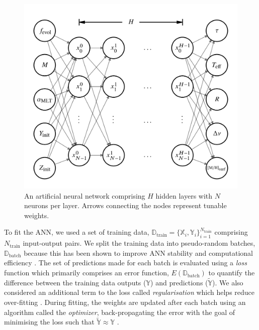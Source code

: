 \documentclass[fleqn,usenatbib]{mnras}
\begin{document}
\begin{figure}
    \includegraphics[width=\linewidth]{figures/network_10.png}
    \caption{An artificial neural network comprising $H$ hidden layers with $N$ neurons per layer. Arrows connecting the nodes represent tunable weights.}
    \label{fig:net}
\end{figure}

To fit the ANN, we used a set of training data, $\boldsymbol{\mathbb{D}}_\mathrm{train} = \{\boldsymbol{\mathbb{X}}_i, \boldsymbol{\mathbb{Y}}_i\}_{i=1}^{N_\mathrm{train}}$ comprising $N_\mathrm{train}$ input-output pairs. We split the training data into pseudo-random batches, $\boldsymbol{\mathbb{D}}_\mathrm{batch}$ because this has been shown to improve ANN stability and computational efficiency \citep{Masters.Luschi2018}. The set of predictions made for each batch is evaluated using a \emph{loss} function which primarily comprises an error function, $E(\boldsymbol{\mathbb{D}}_\mathrm{batch})$ to quantify the difference between the training data outputs ($\boldsymbol{\mathbb{Y}}$) and predictions ($\widetilde{\boldsymbol{\mathbb{Y}}}$). We also considered an additional term to the loss called \emph{regularisation} which helps reduce over-fitting \citep{Goodfellow.Bengio.ea2016}. During fitting, the weights are updated after each batch using an algorithm called the \emph{optimizer}, back-propagating the error with the goal of minimising the loss such that $\widetilde{\boldsymbol{\mathbb{Y}}} \approx \boldsymbol{\mathbb{Y}}$ \citep[see e.g.][]{Rumelhart.Hinton.ea1986}.
\end{document}
